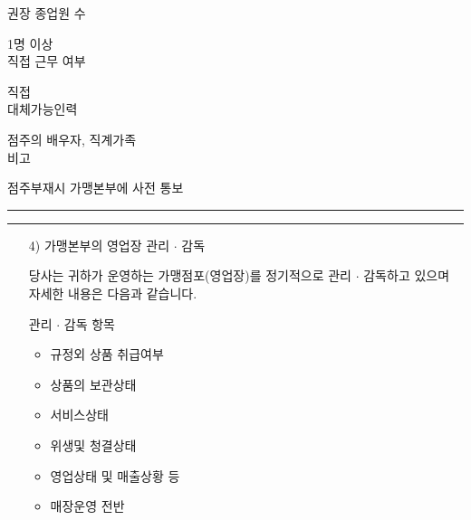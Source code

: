 \documentclass[a5paper,10pt]{oblivoir}
\newcommand\crule[3][black]{\textcolor{#1}{\rule{#2}{#3}}}
\begin{document}
\begin{enumerate}
\begin{enumerate}
\begin{tiny}
\begin{Form}
\def\LayoutCheckField#1#2{%
  \parbox[c][5mm]{5mm}{\centering\footnotesize\strut #1\\#2}%
}
\def\LayoutCheckField#1#2{%
  \makebox[0pt][l]{%
    \makebox[5mm][c]{\footnotesize\strut #1}%
  }%
  #2%
}
\def\DefaultHeightofCheckBox{5mm}
\def\DefaultWidthofCheckBox{5mm}

\rule{0cm}{.5cm}

 권장 종업원 수

\noindent\dotfill 
1명 이상
\\

 직접 근무 여부

\noindent\dotfill 
 직접
\\

 대체가능인력

\noindent\dotfill 
 점주의 배우자, 직계가족
\\

 비고

\noindent\dotfill 
 점주부재시 가맹본부에 사전 통보
\\
\end{Form}
\end{tiny}
\end{enumerate}
\newpage
\begin{center}
\crule[red]{4cm}{0.1cm} \crule[blue]{4cm}{0.1cm}
\end{center}
\begin{enumerate}
\item[4)] 가맹본부의 영업장 관리 $\cdot$ 감독

당사는 귀하가 운영하는 가맹점포(영업장)를 정기적으로 관리 $\cdot$ 감독하고 있으며 자세한 내용은 다음과 같습니다.


\begin{tiny}
\begin{Form}
\def\LayoutCheckField#1#2{%
  \parbox[c][5mm]{5mm}{\centering\footnotesize\strut #1\\#2}%
}
\def\LayoutCheckField#1#2{%
  \makebox[0pt][l]{%
    \makebox[5mm][c]{\footnotesize\strut #1}%
  }%
  #2%
}
\def\DefaultHeightofCheckBox{5mm}
\def\DefaultWidthofCheckBox{5mm}

\rule{0cm}{.5cm}

 관리 $\cdot$ 감독 항목

\noindent\dotfill 
\begin{itemize}
\item 규정외 상품 취급여부
\item 상품의 보관상태
\item 서비스상태
\item 위생및 청결상태
\item 영업상태 및 매출상황 등
\item 매장운영 전반
\end{itemize}



\end{Form}
\end{tiny}
\end{enumerate}
\end{enumerate}
\end{document}

